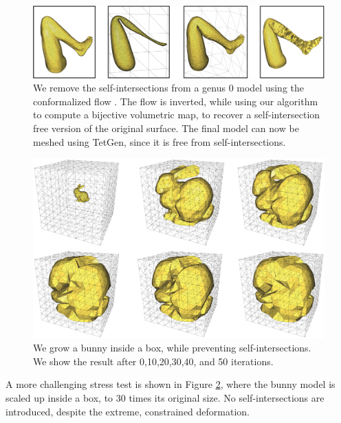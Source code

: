 \begin{figure}[t]
\includegraphics[width=\columnwidth]{scaf-tex/figs/leg-flow}
\caption{We remove the self-intersections from a genus 0 model using the conformalized flow \protect\cite{Kazhdan:2012,Sacht:2013}. The flow is inverted, while using our algorithm to compute a bijective volumetric map, to recover a self-intersection free version of the original surface. The final model can now be meshed using TetGen, since it is free from self-intersections.}
\vspace{-0.2cm}
\label{scaf:fig:flow}
\end{figure}

\begin{figure}[t]
\includegraphics[width=0.8\columnwidth]{scaf-tex/figs/rabbit_grow}
\caption{We grow a bunny inside a box, while preventing  self-intersections. We show the result after 0,10,20,30,40, and 50 iterations.}
\label{scaf:fig:rabbit}
\end{figure}


A more challenging stress test is shown in Figure \ref{scaf:fig:rabbit}, where the bunny model is scaled up inside a box, to 30 times its original size. No self-intersections are introduced, despite the extreme, constrained deformation.

